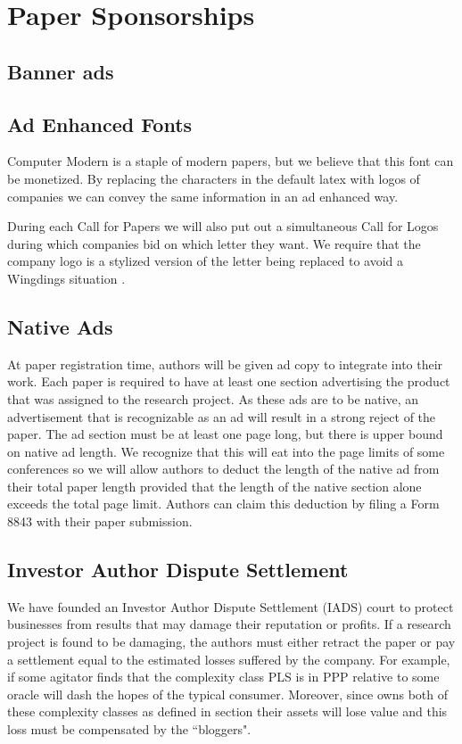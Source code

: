 \section{Paper Sponsorships}

\subsection{Banner ads}

\subsection{Ad Enhanced Fonts}
Computer Modern is a staple of modern papers, but we believe that this font can
be monetized.
By replacing the characters in the default latex with logos of companies we can
convey the same information in an ad enhanced way.

During each Call for Papers we will also put out a simultaneous Call for
Logos during which companies bid on which letter they want.
We require that the company logo is a stylized version of the letter being
replaced to avoid a Wingdings situation .


\subsection{Native Ads}

At paper registration time, authors will be given ad copy to integrate into
their work.
Each paper is required to have at least one section advertising the product
that was assigned to the research project.
As these ads are to be native, an advertisement that is recognizable as an ad
will result in a strong reject of the paper.
The ad section must be at least one page long, but there is upper bound on
native ad length.
We recognize that this will eat into the page limits of some conferences so we
will allow authors to deduct the length of the native ad from their total paper
length provided that the length of the native section alone exceeds the total
page limit.
Authors can claim this deduction by filing a Form 8843 with their paper
submission.

\subsection{Investor Author Dispute Settlement}
We have founded an Investor Author Dispute Settlement (IADS) court to protect
businesses from results that may damage their reputation or profits.
If a research project is found to be damaging, the authors must either retract
the paper or pay a settlement equal to the estimated losses suffered by the
company.
For example, if some agitator finds that the complexity class PLS is in PPP
relative to some oracle will dash the hopes of the typical 
consumer.
Moreover, since  owns both of these complexity classes as defined
in section  their assets will lose value and
this loss must be compensated by the ``bloggers".


